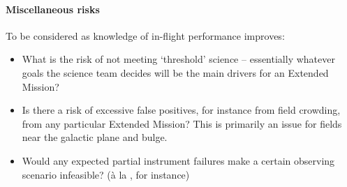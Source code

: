 \paragraph{Miscellaneous risks}
To be considered as knowledge of \tesss in-flight performance improves:
\begin{itemize}
	\item What is the risk of not meeting `threshold' science -- essentially whatever goals the science team decides will be the main drivers for an Extended Mission?
	\item Is there a risk of excessive false positives, for instance from field crowding, from any particular Extended Mission? This is primarily an issue for fields near the galactic plane and bulge.
	\item Would any expected partial instrument failures make a certain observing scenario infeasible? (\`a la \ktwo\!, for instance)
\end{itemize}

